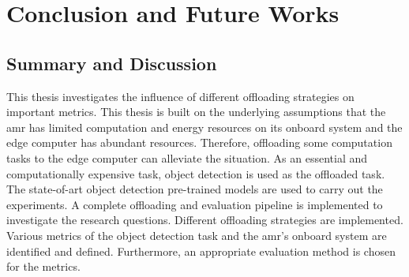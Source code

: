 \chapter{Conclusion and Future Works}\label{ch:conclusion}

\section{Summary and Discussion}\label{sec:conclusion:discussion}

This thesis investigates the influence of different offloading strategies on important metrics. This thesis is built on the underlying assumptions that the \gls{amr} has limited computation and energy resources on its onboard system and the edge computer has abundant resources. Therefore, offloading some computation tasks to the edge computer can alleviate the situation. As an essential and computationally expensive task, object detection is used as the offloaded task. The state-of-art object detection pre-trained models are used to carry out the experiments. A complete offloading and evaluation pipeline is implemented to investigate the research questions. Different offloading strategies are implemented. Various metrics of the object detection task and the \gls{amr}'s onboard system are identified and defined. Furthermore, an appropriate evaluation method is chosen for the metrics. 


